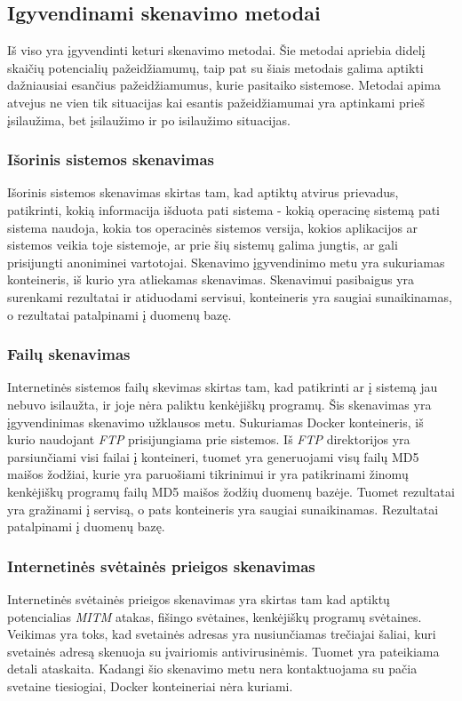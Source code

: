\documentclass[a4paper,12pt,fleqn]{article}
\begin{document}
\subsection{Igyvendinami skenavimo metodai}

Iš viso yra įgyvendinti keturi skenavimo metodai. Šie metodai apriebia didelį skaičių potencialių pažeidžiamumų, taip pat su šiais metodais galima aptikti dažniausiai esančius pažeidžiamumus, kurie pasitaiko sistemose. Metodai apima atvejus ne vien tik situacijas kai esantis pažeidžiamumai yra aptinkami prieš įsilaužima, bet įsilaužimo ir po isilaužimo situacijas.

\subsubsection{Išorinis sistemos skenavimas}
\label{sec:scanOutside}
Išorinis sistemos skenavimas skirtas tam, kad aptiktų atvirus prievadus, patikrinti, kokią informacija išduota pati sistema - kokią operacinę sistemą pati sistema naudoja, kokia tos operacinės sistemos versija, kokios aplikacijos ar sistemos veikia toje sistemoje, ar prie šių sistemų galima jungtis, ar gali prisijungti anoniminei vartotojai. Skenavimo įgyvendinimo metu yra sukuriamas konteineris, iš kurio yra atliekamas skenavimas. Skenavimui pasibaigus yra surenkami rezultatai ir atiduodami servisui, konteineris yra saugiai sunaikinamas, o rezultatai patalpinami į duomenų bazę.
\subsubsection{Failų skenavimas}
\label{sec:scanFile}
Internetinės sistemos failų skevimas skirtas tam, kad patikrinti ar į sistemą jau nebuvo isilaužta, ir joje nėra paliktu kenkėjiškų programų. Šis skenavimas yra įgyvendinimas skenavimo užklausos metu. Sukuriamas Docker konteineris, iš kurio naudojant \textit{FTP} prisijungiama prie sistemos. Iš \textit{FTP} direktorijos yra parsiunčiami visi failai į konteineri, tuomet yra generuojami visų failų MD5 maišos žodžiai, kurie yra paruošiami tikrinimui ir yra patikrinami žinomų kenkėjiškų programų failų MD5 maišos žodžių duomenų bazėje. Tuomet rezultatai yra gražinami į servisą, o pats konteineris yra saugiai sunaikinamas. Rezultatai patalpinami į duomenų bazę.
\subsubsection{Internetinės svėtainės prieigos skenavimas}
\label{sec:scanUrl}
Internetinės svėtainės prieigos skenavimas yra skirtas tam kad aptiktų potencialias \textit{MITM} atakas, fišingo svėtaines, kenkėjiškų programų svėtaines. Veikimas yra toks, kad svetainės adresas yra nusiunčiamas trečiajai šaliai, kuri svetainės adresą skenuoja su įvairiomis antivirusinėmis. Tuomet yra pateikiama detali ataskaita. Kadangi šio skenavimo metu nera kontaktuojama su pačia svetaine tiesiogiai, Docker konteineriai nėra kuriami.
\end{document}
